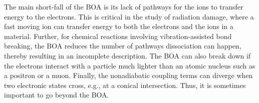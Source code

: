 The main short-fall of the BOA is its lack of pathways for the ions to transfer energy to the electrons. This is critical in the study of radiation damage, where a fast moving ion can transfer energy to both the electrons and the ions in a material.
Further, for chemical reactions involving vibration-assisted bond breaking, the BOA reduces the number of pathways dissociation can happen, thereby resulting in an incomplete description.
The BOA can also break down if the electrons interact with a particle much lighter than an atomic nucleus such as a positron or a muon.
Finally, the nonadiabatic coupling terms can diverge when two electronic states cross, e.g., at a conical intersection.
Thus, it is sometimes important to go beyond the BOA.


